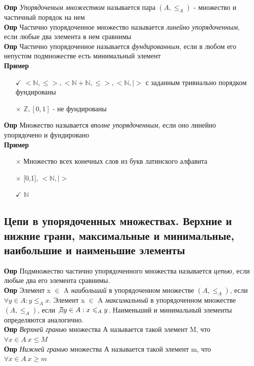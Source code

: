 \textbf{Опр} \textit{Упорядоченым множеством}  называется пара $(A, \leq_A)$ - множество и частичный порядок на нем
\\
\textbf{Опр} Частично упорядоченное множество называется \textit{линейно упорядоченным}, если любые два элемента в нем сравнимы
\\
\textbf{Опр} Частично упорядоченное называется \textit{фундированным}, если в любом его непустом подмножестве есть минимальный элемент
\\
\textbf{Пример}
\begin{itemize}
    \item [$\checkmark$] $<\mathbb{N}, \leq>, <\mathbb{N} + \mathbb{N}, \leq>, <\mathbb{N},|>$ с заданным тривиально порядком фундированы
    \item [$\times$] $\mathbb{Z}, [0,1]$ - не фундированы
\end{itemize}
\textbf{Опр} Множество называется \textit{вполне упорядоченным}, если оно линейно упорядочено и фундировано
\\
\textbf{Пример}
\begin{itemize}
    \item [$\times$ ] Множество всех конечных слов из букв латинского алфавита
    \item [$\times$ ] [0,1], $<\mathbb{N},|>$
     \item [$\checkmark$ ] $\mathbb{N}$
\end{itemize}

\subsection{Цепи в упорядоченных множествах. Верхние и нижние грани, максимальные и минимальные, наибольшие и наименьшие элементы}

\textbf{Опр} Подмножество частично упорядоченного множества называется \textit{цепью}, если любые два его элемента сравнимы.
\\
\textbf{Опр} Элемент x $\in$ A \textit{наибольший} в упорядоченном множестве $(A, \leq_A)$, если $\forall y \in A : y \leq_A x$. Элемент x $\in$ A
\textit{максимальный} в упорядоченном множестве $(A, \leq_A)$, если $\not\exists y \in A : x \leq_A y$. Наименьший и минимальный
элементы определяются аналогично.
\\
\textbf{Опр}  \textit{Верхней гранью} множества А называется такой элемент M, что $\forall x \in A \ x\leq M$
\\
\textbf{Опр}  \textit{Нижней гранью} множества А называется такой элемент m, что $\forall x \in A \ x\geq m$
\\
